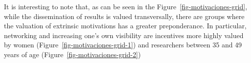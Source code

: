 \documentclass[
  letterpaper,
  DIV=11,
  numbers=noendperiod]{scrartcl}
\begin{document}
It is interesting to note that, as can be seen in the
Figure~\ref{fig-motivaciones-grid}, while the dissemination of results
is valued transversally, there are groups where the valuation of
extrinsic motivations has a greater preponderance. In particular,
networking and increasing one's own visibility are incentives more
highly valued by women (Figure~\ref{fig-motivaciones-grid-1}) and
researchers between 35 and 49 years of age
(Figure~\ref{fig-motivaciones-grid-2})

\begin{figure}

\begin{minipage}[t]{0.50\linewidth}

{\centering 


}

\end{minipage}%
%
\begin{minipage}[t]{0.50\linewidth}

{\centering 

\raisebox{-\height}{

}}
\end{minipage}
\end{figure}
\end{document}
